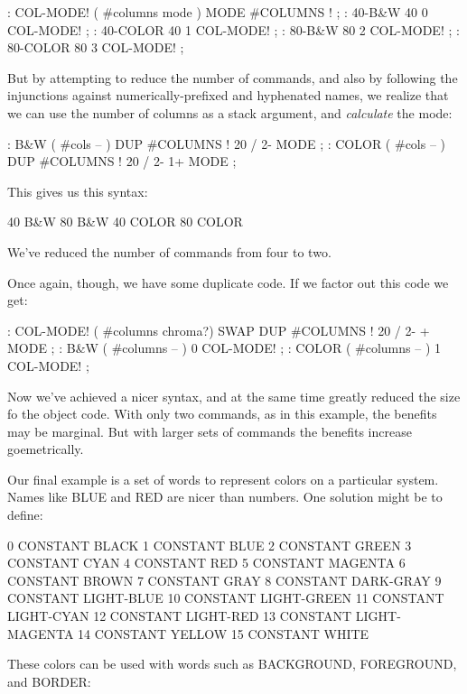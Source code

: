 \begin{Code}
: COL-MODE!     ( #columns mode )  MODE  #COLUMNS ! ;
: 40-B&W       40 0 COL-MODE! ;
: 40-COLOR     40 1 COL-MODE! ;
: 80-B&W       80 2 COL-MODE! ;
: 80-COLOR     80 3 COL-MODE! ;
\end{Code}
But by attempting to reduce the number of commands, and also by following the injunctions against numerically-prefixed and hyphenated names, we realize that we can use the number of columns as a stack argument, and \emph{calculate} the mode:

\begin{Code}
: B&W    ( #cols -- )  DUP #COLUMNS !  20 /  2-     MODE ;
: COLOR  ( #cols -- )  DUP #COLUMNS !  20 /  2-  1+ MODE ;
\end{Code}
This gives us this syntax:

\begin{Code}
40 B&W
80 B&W
40 COLOR
80 COLOR
\end{Code}
We've reduced the number of commands from four to two.

Once again, though, we have some duplicate code. If we factor out this code we get:

\begin{Code}
: COL-MODE!  ( #columns chroma?)
   SWAP DUP #COLUMNS !  20 / 2-  +  MODE ;
: B&W    ( #columns -- )  0 COL-MODE! ;
: COLOR  ( #columns -- )  1 COL-MODE! ;
\end{Code}

\noindent
Now we've achieved a nicer syntax, and at the same time greatly reduced the size fo the object code. With only two commands, as in this example, the benefits may be marginal. But with larger sets of commands the benefits increase goemetrically.

Our final example is a set of words to represent colors on a particular system. Names like BLUE and RED are nicer than numbers. One solution might be to define:

\begin{Code}
 0 CONSTANT BLACK                 1 CONSTANT BLUE
 2 CONSTANT GREEN                 3 CONSTANT CYAN
 4 CONSTANT RED                   5 CONSTANT MAGENTA
 6 CONSTANT BROWN                 7 CONSTANT GRAY
 8 CONSTANT DARK-GRAY             9 CONSTANT LIGHT-BLUE
10 CONSTANT LIGHT-GREEN          11 CONSTANT LIGHT-CYAN
12 CONSTANT LIGHT-RED            13 CONSTANT LIGHT-MAGENTA
14 CONSTANT YELLOW               15 CONSTANT WHITE
\end{Code}
These colors can be used with words such as BACKGROUND, FOREGROUND, and BORDER:


